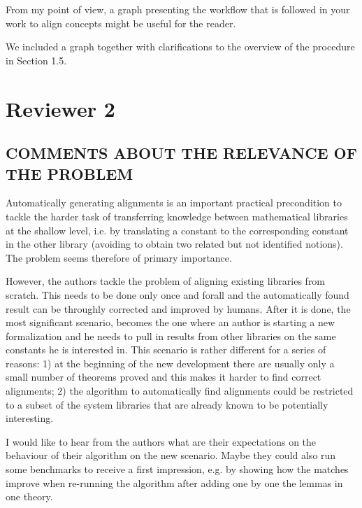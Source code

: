 \documentclass[]{scrartcl}
\begin{document}
\begin{leftbar}
From my point of view, a graph presenting the workflow that is followed in your 
work to
align concepts might be useful for the reader.
\end{leftbar}
We included a graph together with clarifications to the overview of the 
procedure in Section 1.5.

\section*{Reviewer 2}

\subsection*{COMMENTS ABOUT THE RELEVANCE OF THE PROBLEM}

\begin{leftbar}
Automatically generating alignments is an important practical precondition to 
tackle the harder task of transferring knowledge between mathematical libraries 
at the shallow level, i.e. by translating a constant to the corresponding 
constant in the other library (avoiding to obtain two related but not 
identified notions). The problem seems therefore of primary importance.

However, the authors tackle the problem of aligning existing libraries from 
scratch. This needs to be done only once and forall and the automatically found 
result can be throughly corrected and improved by humans. After it is done, the 
most significant scenario, becomes the one where an author is starting a new 
formalization and he needs to pull in results from other libraries on the same 
constants he is interested in. This scenario is rather different for a series 
of reasons: 1) at the beginning of the new development there are usually only a 
small number of theorems proved and this makes it harder to find correct 
alignments; 2) the algorithm to automatically find alignments could be 
restricted to a subset of the system libraries that are already known to be 
potentially interesting.

I would like to hear from the authors what are their expectations on the 
behaviour of their algorithm on the new scenario. Maybe they could also run 
some benchmarks to receive a first impression, e.g. by showing how the matches 
improve when re-running the algorithm after adding one by one the lemmas in one 
theory.
\end{leftbar}
\end{document}
